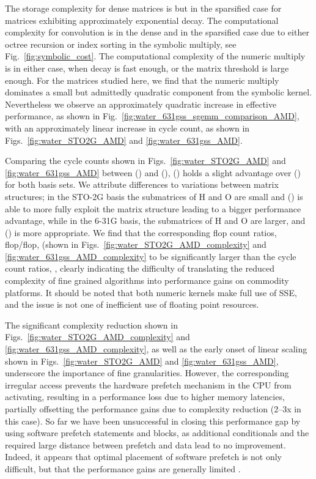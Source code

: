 The storage complexity for dense matrices is  but  in the sparsified case for matrices exhibiting
approximately exponential decay. The computational complexity for convolution
is  in the dense and  in the sparsified case due to either octree recursion
or index sorting in the symbolic multiply, see Fig.~\ref{fig:symbolic_cost}.
The computational complexity of the numeric multiply is  in
either case, when decay is fast enough, or the matrix threshold is large
enough. For the matrices studied here, we find that the numeric multiply
dominates a small but admittedly quadratic component from the symbolic kernel.
Nevertheless we observe an approximately quadratic increase in effective
performance, as shown in Fig.~\ref{fig:water_631gss_sgemm_comparison_AMD},
with an approximately linear increase in cycle count, as shown in
Figs.~\ref{fig:water_STO2G_AMD} and \ref{fig:water_631gss_AMD}.

Comparing the cycle counts shown in Figs.~\ref{fig:water_STO2G_AMD} and
\ref{fig:water_631gss_AMD} between \SpAMM{}() and \SpAMM{}(), \SpAMM{}() holds a slight advantage over \SpAMM{}() for both basis sets. We attribute differences to variations
between matrix structures; in the STO-2G basis the submatrices of H and O are
small and \SpAMM{}() is able to more fully exploit the matrix
structure leading to a bigger performance advantage, while in the
6-31G basis, the submatrices of H and O are larger, and \SpAMM{}() is more appropriate. We find that the corresponding flop count
ratios, flop/flop, (shown in
Figs.~\ref{fig:water_STO2G_AMD_complexity} and
\ref{fig:water_631gss_AMD_complexity} to be significantly larger than the
cycle count ratios, , clearly indicating the difficulty of
translating the reduced complexity of fine grained algorithms into performance
gains on commodity platforms. It should be noted that both numeric kernels
make full use of SSE, and the issue is not one of inefficient use of floating
point resources.

The significant complexity reduction shown in
Figs.~\ref{fig:water_STO2G_AMD_complexity} and
\ref{fig:water_631gss_AMD_complexity}, as well as the early onset of linear
scaling shown in Figs.~\ref{fig:water_STO2G_AMD} and
\ref{fig:water_631gss_AMD}, underscore the importance of fine granularities.
However, the corresponding irregular access prevents the hardware prefetch
mechanism in the CPU from activating, resulting in a performance loss due to
higher memory latencies, partially offsetting the performance gains due to
complexity reduction (2--3x in this case). So far we have been unsuccessful in
closing this performance gap by using software prefetch statements and  blocks, as additional conditionals and the required large distance
between prefetch and data lead to no improvement.  Indeed, it appears that
optimal placement of software prefetch is not only difficult, but that the
performance gains are generally limited \cite{chilimbi2000making,
yang2000push, badawy2004efficacy, huang2009performance}.

